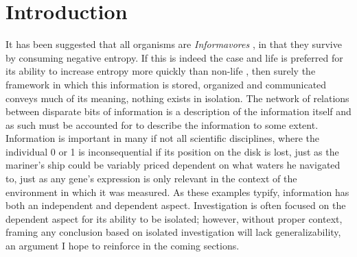 

\graphicspath{{1_introduction/figures/}} %





\setcounter{page}{1}
\chapter{Introduction}
\label{sec:intro}
It has been suggested that all organisms are \emph{Informavores} \citep{MARGALEF1996141}, in that they survive by consuming negative entropy. If this is indeed the case and life is preferred for its ability to increase entropy more quickly than non-life \citep{england2013statistical}, then surely the framework in which this information is stored, organized and communicated conveys much of its meaning, \ie nothing exists in isolation. The network of relations between disparate bits of information is a description of the information itself and as such must be accounted for to describe the information to some extent. Information is important in many if not all scientific disciplines, where the individual 0 or 1 is inconsequential if its position on the disk is lost, just as the mariner's ship could be variably priced dependent on what waters he navigated to, just as any gene's expression is only relevant in the context of the environment in which it was measured. As these examples typify, information has both an independent and dependent aspect. Investigation is often focused on the dependent aspect for its ability to be isolated; however, without proper context, framing any conclusion based on isolated investigation will lack generalizability, an argument I hope to reinforce in the coming sections.

